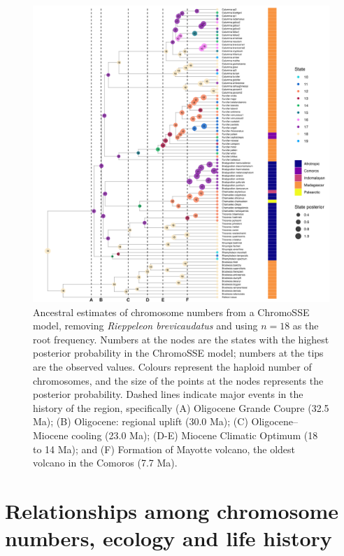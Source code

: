 \documentclass[a4paper, 12pt]{article}
\begin{document}
\newpage
\begin{figure}[H]
 \centering
  \includegraphics[width = \linewidth]{figures/biogeography-figure.png}
  \caption{Ancestral estimates of chromosome numbers from a ChromoSSE model, removing \textit{Rieppeleon brevicaudatus} and using $n = 18$ as the root frequency. Numbers at the nodes are the states with the highest posterior probability in the ChromoSSE model; numbers at the tips are the observed values. Colours represent the haploid number of chromosomes, and the size of the points at the nodes represents the posterior probability. Dashed lines indicate major events in the history of the region, specifically (A) Oligocene Grande Coupre (32.5 Ma); (B) Oligocene: regional uplift (30.0 Ma); (C) Oligocene–Miocene cooling (23.0 Ma); (D-E) Miocene Climatic Optimum (18 to 14 Ma); and (F) Formation of Mayotte volcano, the oldest volcano in the Comoros (7.7 Ma).
}
  \label{fig-biogeography}
\end{figure} 


\newpage
\section{Relationships among chromosome numbers, ecology and life history}
\end{document}
